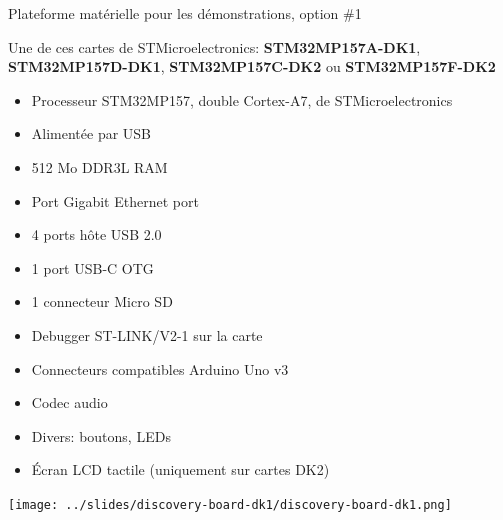\documentclass[a4paper,12pt,obeyspaces,spaces,hyphens]{article}
\begin{document}
\feshowtitle

\onlinepedagogics
{}
\certificate{}
\disabilities{}

\feagendatwocolumn
{Plateforme matérielle pour les démonstrations, option \#1}
{
  Une de ces cartes de STMicroelectronics: {\bf
  STM32MP157A-DK1}, {\bf STM32MP157D-DK1}, {\bf STM32MP157C-DK2} ou
  {\bf STM32MP157F-DK2}
  \begin{itemize}
  \item Processeur STM32MP157, double Cortex-A7, de STMicroelectronics
  \item Alimentée par USB
  \item 512 Mo DDR3L RAM
  \item Port Gigabit Ethernet port
  \item 4 ports hôte USB 2.0
  \item 1 port USB-C OTG
  \item 1 connecteur Micro SD
  \item Debugger ST-LINK/V2-1 sur la carte
  \item Connecteurs compatibles Arduino Uno v3
  \item Codec audio
  \item Divers: boutons, LEDs
  \item Écran LCD tactile (uniquement sur cartes DK2)
  \end{itemize}
}
{}
{
  \begin{center}
    \texttt{[image: ../slides/discovery-board-dk1/discovery-board-dk1.png]}
  \end{center}
}
\end{document}
